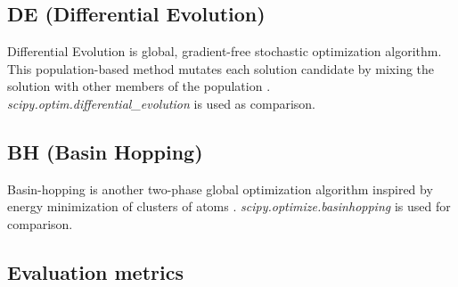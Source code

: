 



%    

%    


\subsection{DE (Differential Evolution)}
\label{compare:de}

Differential Evolution is global, gradient-free stochastic optimization algorithm. This population-based method mutates
each solution candidate by mixing the solution with other members of the  population \cite{storn}.
\emph{scipy.optim.differential\_evolution} is used as comparison.

\subsection{BH (Basin Hopping)}
\label{compare:bh}

Basin-hopping is another two-phase global optimization algorithm inspired by energy minimization of clusters of atoms \cite{wales}.
\emph{scipy.optimize.basinhopping} is used for comparison.


\subsection{Evaluation metrics}

